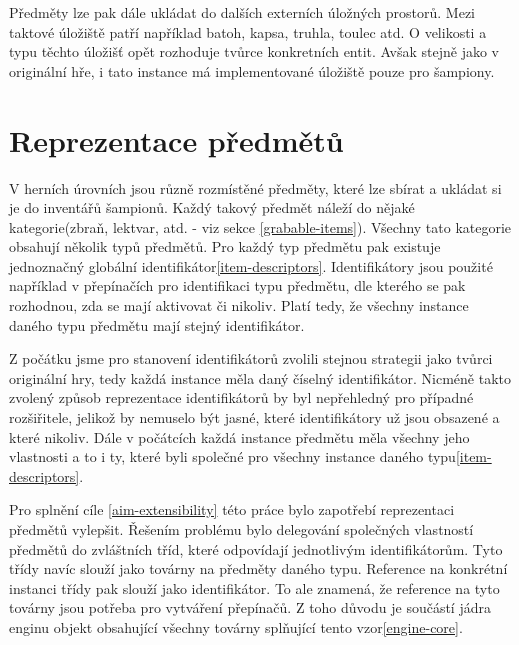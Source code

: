 Předměty lze pak dále ukládat do dalších externích úložných prostorů. 
Mezi taktové úložiště patří například batoh, kapsa, truhla, toulec atd.
O velikosti a typu těchto úložišť opět rozhoduje tvůrce konkretních 
entit. Avšak stejně jako v originální hře, i tato instance má implementované 
úložiště pouze pro šampiony.

\section{Reprezentace předmětů}\label{item-factories}

V herních úrovních jsou různě rozmístěné předměty, které lze sbírat a ukládat si je do inventářů šampionů.
Každý takový předmět náleží do nějaké kategorie(zbraň, lektvar, atd. - viz sekce \ref{grabable-items}). Všechny 
tato kategorie obsahují několik typů předmětů. Pro každý typ předmětu pak existuje jednoznačný globální identifikátor\vref{item-descriptors}.
Identifikátory jsou použité například v přepínačích pro identifikaci typu předmětu, dle kterého se pak rozhodnou, 
zda se mají aktivovat či nikoliv. Platí tedy, že všechny instance daného typu předmětu mají stejný identifikátor.

Z počátku jsme pro stanovení identifikátorů zvolili stejnou strategii jako tvůrci originální hry, tedy každá
instance měla daný číselný identifikátor.
Nicméně takto zvolený způsob reprezentace identifikátorů by byl nepřehledný pro případné rozšiřitele, jelikož
by nemuselo být jasné, které identifikátory už jsou obsazené a které nikoliv. Dále v počátcích každá instance
předmětu měla všechny jeho vlastnosti a to i ty, které byli společné pro všechny instance daného typu\vref{item-descriptors}.

Pro splnění cíle \ref{aim-extensibility} této práce bylo zapotřebí reprezentaci předmětů vylepšit.
Řešením problému bylo delegování společných vlastností předmětů do zvláštních tříd, které odpovídají jednotlivým identifikátorům.
Tyto třídy navíc slouží jako továrny na předměty daného typu. Reference na konkrétní instanci třídy pak slouží jako identifikátor.
To ale znamená, že reference na tyto továrny jsou potřeba pro vytváření přepínačů. Z toho důvodu je součástí jádra enginu
objekt obsahující všechny továrny splňující tento vzor\vref{engine-core}.

